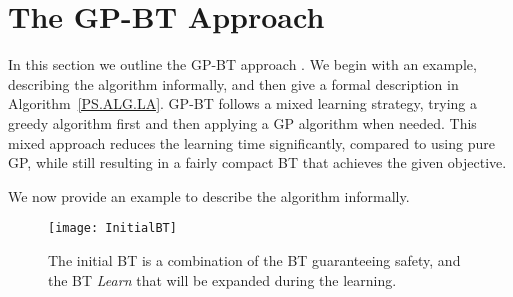 %


\section{The GP-BT Approach}
\label{sec.gp}
In this section we outline the GP-BT approach \cite{colledanchise2015learning}. We begin with an example, describing the algorithm informally, and then  give a  formal description in Algorithm~\ref{PS.ALG.LA}.
GP-BT follows a mixed learning strategy,  trying a greedy algorithm first and then applying a GP algorithm when needed. This mixed approach reduces the learning time significantly, compared to using pure GP, while still resulting in a fairly compact BT that achieves the given objective.


%
%
We now provide an example to describe the algorithm informally.

\begin{figure}[h]
\centering
\texttt{[image: InitialBT]}
\caption{The initial BT is a combination of the BT guaranteeing safety, and the BT \emph{Learn} that will be expanded during the learning.  }
\label{PA.fig.InitialBT}
\end{figure}


